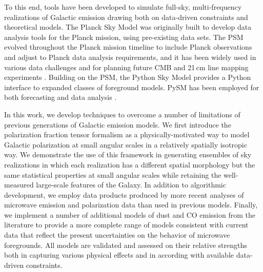 \documentclass[twocolumn]{aastex631}
\newcommand{\giuse}[1]{\textcolor{orange}{(GP: #1)}}
\begin{document}
To this end, tools have been developed to simulate full-sky, multi-frequency realizations of Galactic emission drawing both on data-driven constraints and theoretical models. The Planck Sky Model \citep[PSM;][]{delabrouille2012} was originally built to develop data analysis tools for the Planck mission, using pre-existing data sets. The PSM evolved throughout the Planck mission timeline to include Planck observations and adjust to Planck data analysis requirements, and it has been widely used in various data challenges and for planning future CMB and 21\,cm line mapping experiments \citep[e.g.,][]{Remazeilles:2018, Fornazier:2022, Ghosh:2022}. Building on the PSM, the Python Sky Model \citep[PySM;][]{Thorne:2017} provides a Python interface to expanded classes of foreground models. PySM has been employed for both forecasting \citep[e.g.,][]{Abazajian:2022, Hensley:2022, CCAT-PrimeCollaboration:2023, Wolz:2024} and data analysis \citep[e.g.,][]{Vacher:2023, SPIDERCollaboration:2024}.

In this work, we develop techniques to overcome a number of limitations of previous generations of Galactic emission models. We first introduce the polarization fraction tensor formalism as a physically-motivated way to model Galactic polarization at small angular scales in a relatively spatially isotropic way. We demonstrate the use of this framework in generating ensembles of sky realizations in which each realization has a different spatial morphology but the same statistical properties at small angular scales while retaining the well-measured large-scale features of the Galaxy. In addition to algorithmic development, we employ data products produced by more recent analyses of microwave emission and polarization data than used in previous models. Finally, we implement a number of additional models of dust and CO emission from the literature to provide a more complete range of models consistent with current data that reflect the present uncertainties on the behavior of microwave foregrounds. All models are validated and assessed on their relative strengths both in capturing various physical effects and in according with available data-driven constraints.

\end{document}
